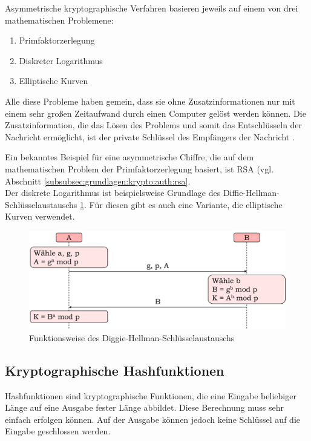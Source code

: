 		Asymmetrische kryptographische Verfahren basieren jeweils auf einem von drei mathematischen Problemene:
		
		\begin{enumerate}
			\item Primfaktorzerlegung
			\item Diskreter Logarithmus
			\item Elliptische Kurven
		\end{enumerate}
	
		Alle diese Probleme haben gemein, dass sie ohne Zusatzinformationen nur mit einem sehr großen Zeitaufwand durch einen Computer gelöst werden können. Die Zusatzinformation, die das Lösen des Problems und somit das Entschlüsseln der Nachricht ermöglicht, ist der private Schlüssel des Empfängers der Nachricht \cite{Paar2010-C}.
		
		Ein bekanntes Beispiel für eine asymmetrische Chiffre, die auf dem mathematischen Problem der Primfaktorzerlegung basiert, ist \ac{RSA} (vgl. Abschnitt \ref{subsubsec:grundlagen:krypto:auth:rsa}.\\
		
		Der diskrete Logarithmus ist beispielsweise Grundlage des Diffie-Hellman-Schlüsselaustauschs \ref{fig:grundlagen:dhke}. Für diesen gibt es auch eine Variante, die elliptische Kurven verwendet.\\
		
		\begin{figure}[htbp]
			\centering
			\includegraphics[width=\textwidth]{chapters/abb/grundlagen-dhke}
			\caption{Funktionsweise des Diggie-Hellman-Schlüsselaustauschs}
			\label{fig:grundlagen:dhke}
		\end{figure}
		
		\subsection{Kryptographische Hashfunktionen}
		\label{subsec:grundlagen:krypto:hash}
		
		Hashfunktionen sind kryptographische Funktionen, die eine Eingabe beliebiger Länge auf eine Ausgabe fester Länge abbildet. Diese Berechnung muss sehr einfach erfolgen können. Auf der Ausgabe können jedoch keine Schlüssel auf die Eingabe geschlossen werden.\\
		
